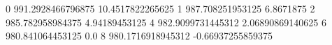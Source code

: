 0 991.2928466796875 10.4517822265625
1 987.708251953125 6.8671875
2 985.782958984375 4.94189453125
4 982.9099731445312 2.06890869140625
6 980.841064453125 0.0
8 980.1716918945312 -0.66937255859375

